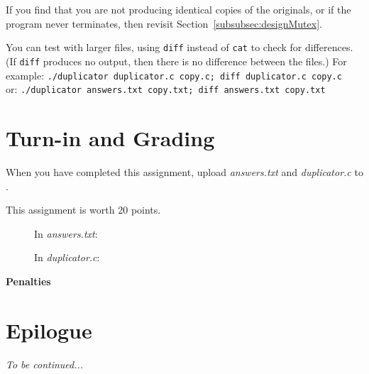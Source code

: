     If you find that you are not producing identical copies of the originals, or if the program never terminates, then revisit Section~\ref{subsubsec:designMutex}.

    You can test with larger files, using \texttt{diff} instead of \texttt{cat} to check for differences.
    (If \texttt{diff} produces no output, then there is no difference between the files.)
    For example: \texttt{./duplicator duplicator.c copy.c; diff duplicator.c copy.c} \\
    or: \texttt{./duplicator answers.txt copy.txt; diff answers.txt copy.txt}


    \section{Turn-in and Grading}

    When you have completed this assignment, upload \textit{answers.txt} and \textit{duplicator.c} to
    \filesubmission.

    This assignment is worth 20 points. \\

    \begin{description}
        \item[] In \textit{answers.txt}:
        \item[] In \textit{duplicator.c}:
    \end{description}

    \textbf{Penalties}
    \begin{description}
    \end{description}


    \section{Epilogue}

    \WeNeedBetterLocks

    \textit{To be continued...}


